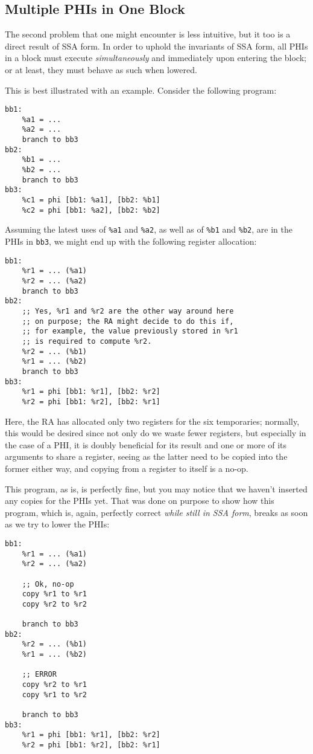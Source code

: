 \documentclass[12pt]{report}
\begin{document}
\subsection{Multiple PHIs in One Block}
The second problem that one might encounter is less intuitive, but it too is a direct result of SSA form. In order to uphold the invariants
of SSA form, all PHIs in a block must execute \textit{simultaneously} and immediately upon entering the block; or at least, they must 
behave as such when lowered.

This is best illustrated with an example. Consider the following program:
\begin{Verbatim}
bb1:
    %a1 = ...
    %a2 = ...
    branch to bb3
bb2:
    %b1 = ...
    %b2 = ...
    branch to bb3
bb3:
    %c1 = phi [bb1: %a1], [bb2: %b1]
    %c2 = phi [bb1: %a2], [bb2: %b2]
\end{Verbatim}

\noindent Assuming the latest uses of \verb|%a1| and \verb|%a2|, as well as of \verb|%b1| and \verb|%b2|, are in the PHIs in \verb|bb3|, we 
might end up with the following register allocation:
\begin{Verbatim}
bb1:
    %r1 = ... (%a1)
    %r2 = ... (%a2)
    branch to bb3
bb2:
    ;; Yes, %r1 and %r2 are the other way around here
    ;; on purpose; the RA might decide to do this if, 
    ;; for example, the value previously stored in %r1
    ;; is required to compute %r2.
    %r2 = ... (%b1)
    %r1 = ... (%b2)
    branch to bb3
bb3:
    %r1 = phi [bb1: %r1], [bb2: %r2]
    %r2 = phi [bb1: %r2], [bb2: %r1]
\end{Verbatim}

\noindent Here, the RA has allocated only two registers for the six temporaries; normally, this would be desired since not only do we waste
fewer registers, but especially in the case of a PHI, it is doubly beneficial for its result and one or more of its arguments to share a
register, seeing as the latter need to be copied into the former either way, and copying from a register to itself is a no-op.

This program, as is, is perfectly fine, but you may notice that we haven't inserted any copies for the PHIs yet. That was done on purpose
to show how this program, which is, again, perfectly correct \textit{while still in SSA form}, breaks as soon as we try to lower the PHIs:
\begin{Verbatim}
bb1:
    %r1 = ... (%a1)
    %r2 = ... (%a2)

    ;; Ok, no-op
    copy %r1 to %r1 
    copy %r2 to %r2

    branch to bb3
bb2:
    %r2 = ... (%b1)
    %r1 = ... (%b2)

    ;; ERROR
    copy %r2 to %r1 
    copy %r1 to %r2

    branch to bb3
bb3:
    %r1 = phi [bb1: %r1], [bb2: %r2]
    %r2 = phi [bb1: %r2], [bb2: %r1]
\end{Verbatim}
\end{document}
